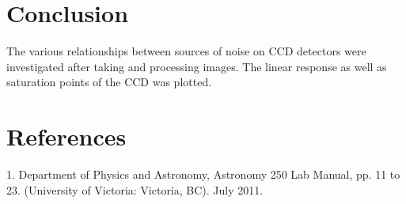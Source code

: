 \documentclass{article}
\begin{document}
\section{Conclusion}
The various relationships between sources of noise on CCD detectors were investigated after taking and processing images. The linear response as well as saturation points of the CCD was plotted. 
\section{References}
1. Department of Physics and Astronomy, Astronomy 250 Lab Manual, pp. 11 to 23. (University of Victoria: Victoria, BC). July 2011.\\
\end{document}
